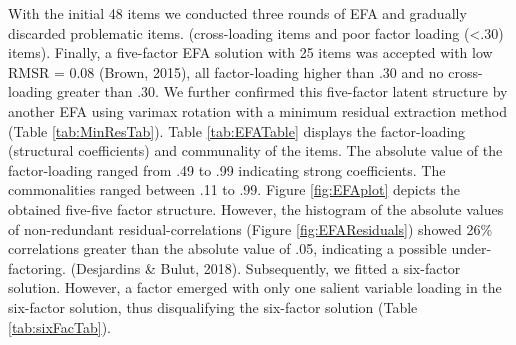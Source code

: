 \documentclass[
  english,
  man]{apa6}
\begin{document}
With the initial 48 items we conducted three rounds of EFA and gradually discarded problematic items. (cross-loading items and poor factor loading (\textless.30) items). Finally, a five-factor EFA solution with 25 items was accepted with low RMSR = 0.08 (Brown, 2015), all factor-loading higher than .30 and no cross-loading greater than .30. We further confirmed this five-factor latent structure by another EFA using varimax rotation with a minimum residual extraction method (Table \ref{tab:MinResTab}). Table \ref{tab:EFATable} displays the factor-loading (structural coefficients) and communality of the items. The absolute value of the factor-loading ranged from .49 to .99 indicating strong coefficients. The commonalities ranged between .11 to .99. Figure \ref{fig:EFAplot} depicts the obtained five-five factor structure. However, the histogram of the absolute values of non-redundant residual-correlations (Figure \ref{fig:EFAResiduals}) showed 26\% correlations greater than the absolute value of .05, indicating a possible under-factoring. (Desjardins \& Bulut, 2018). Subsequently, we fitted a six-factor solution. However, a factor emerged with only one salient variable loading in the six-factor solution, thus disqualifying the six-factor solution (Table \ref{tab:sixFacTab}).
\end{document}
